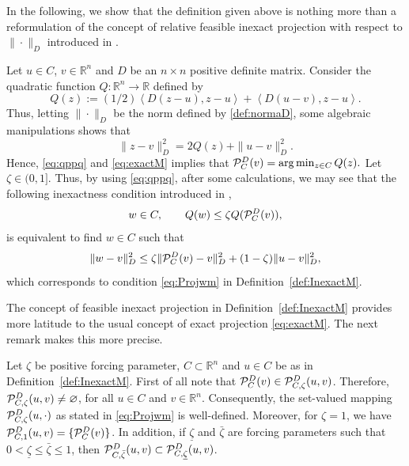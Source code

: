 In the following, we show that the definition given above is nothing more than a reformulation of the concept of  relative feasible inexact projection with respect to $\| \cdot \|_{D}$  introduced in  \cite{BirginMartinezRaydan2003}.
\begin{remark}\normalfont
	Let $u\in C$, $v\in \mathbb{R}^n$ and  $D$ be   an $n\times n$ positive definite matrix. Consider the quadratic  function $Q: \mathbb{R}^n \to \mathbb{R}$ defined by
	$$
		Q(z):=(1/2) \left\langle {D}(z-u),z-u\right\rangle +  \left \langle D(u-v), z-u \right\rangle.
	$$
	Thus,  letting  $\| \cdot \|_{D}$  be  the norm  defined by \eqref{def:normaD},  some algebraic manipulations   shows that
	\begin{equation} \label{eq:qppq}
		\|z-v\|^2_{D}= 2Q(z) +\|u-v\|^2_{D}.
	\end{equation}
	Hence,  \eqref{eq:qppq}  and \eqref{eq:exactM}  implies  that    ${\cal P}_{C}^{D}(v)=\arg \min _{z\in C}Q(z).$
	Let $\zeta\in (0, 1]$. Thus, by using \eqref{eq:qppq},  after some calculations,  we may see that  the following inexactness condition  introduced in \cite{BirginMartinezRaydan2003},
	$$
		w\in C, \qquad Q(w)\leq \zeta Q ( {\cal P}_{C}^{D}(v)) ,
	$$
	is  equivalent to find  $w\in C$ such that
	$$
		\|w-v\|_{D}^2\leq \zeta \| {\cal P}_{C}^{D}(v)-v\|_{D}^2+(1-\zeta)\|u-v\|_{D}^2,
	$$
	which corresponds to condition \eqref{eq:Projwm} in Definition~\ref{def:InexactM}.
\end{remark}\normalfont
The  concept of  feasible inexact projection  in Definition~\ref{def:InexactM}  provides  more latitude to   the usual  concept  of exact projection \eqref{eq:exactM}.  The next   remark makes  this more precise.
\begin{remark}\normalfont%
	Let $\zeta$ be positive forcing parameter, $C\subset {\mathbb R}^n$ and $u\in C$ be as in Definition~\ref{def:InexactM}.  First of all note that  ${\cal P}_{C}^{D}( v) \in {\cal P}_{C,\zeta}^{D}(u, v)$. Therefore,  ${\cal P}_{C,\zeta}^{D}(u, v)\neq \varnothing$, for all $u\in C$ and $v\in {\mathbb R}^n$. Consequently, the set-valued mapping ${\cal P}_{C,\zeta}^{D}(u,  \cdot)$ as stated in \eqref{eq:Projwm} is well-defined.   Moreover,  for $\zeta=1$, we have ${\cal P}_{C,1}^{D}(u, v)=\{{\cal P}_{C}^{D}(v)\}$.
	In addition, if $\underline{\zeta}$ and $\bar{\zeta}$ are forcing parameters such that $0<\underline{\zeta}\leq \bar{\zeta}\leq 1$, then ${\cal P}_{C,\bar{\zeta}}^{D}(u, v) \subset {\cal P}_{C,\underline{\zeta}}^{D}(u, v)$.
\end{remark}\normalfont
